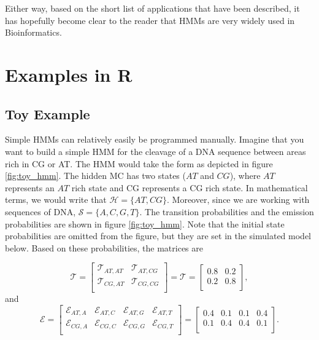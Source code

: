 \documentclass{article}\usepackage[]{graphicx}\usepackage[]{color}
\begin{document}
Either way, based on the short list of applications that have been described, it has hopefully become clear to the reader that HMMs are very widely used in Bioinformatics. 

\section{Examples in R}

\subsection{Toy Example}\label{Section:ToyExample}

Simple HMMs can relatively easily be programmed manually. Imagine that you want to build a simple HMM for the cleavage of a DNA sequence between areas rich in CG or AT. The HMM would take the form as depicted in figure \ref{fig:toy_hmm}. The hidden MC has two states ($AT$ and $CG$), where $AT$ represents an $AT$ rich state and CG represents a CG rich state. In mathematical terms, we would write that $\mathcal{H} = \{AT, CG\}$. Moreover, since we are working with sequences of DNA, $\mathcal{S} = \{A,C,G,T\}$. The transition probabilities and the emission probabilities are shown in figure \ref{fig:toy_hmm}. Note that the initial state probabilities are omitted from the figure, but they are set in the simulated model below. Based on these probabilities, the matrices are

\begin{equation*}
  \mathcal{T} = \begin{bmatrix}
      \mathcal{T}_{AT, AT} & \mathcal{T}_{AT, CG} \\
      \mathcal{T}_{CG, AT} & \mathcal{T}_{CG, CG}  \\
  \end{bmatrix} = \mathcal{T} = \begin{bmatrix}
      0.8 & 0.2 \\
      0.2 & 0.8  \\
  \end{bmatrix},
\end{equation*}
and 
\begin{equation*}
  \mathcal{E} = \begin{bmatrix}
      \mathcal{E}_{AT, A} & \mathcal{E}_{AT, C} & \mathcal{E}_{AT, G} & \mathcal{E}_{AT, T}\\
      \mathcal{E}_{CG, A} & \mathcal{E}_{CG, C} & \mathcal{E}_{CG, G} & \mathcal{E}_{CG, T}\\
  \end{bmatrix} = \begin{bmatrix}
     0.4 & 0.1 & 0.1 & 0.4 \\
      0.1 & 0.4 & 0.4 & 0.1 \\
  \end{bmatrix}.
\end{equation*}
\end{document}
